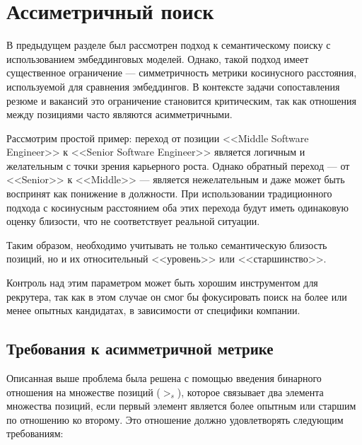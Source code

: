 \documentclass[14pt]{mmcs_article}
\begin{document}
\section{Ассиметричный поиск}\label{assymetric_search}

В предыдущем разделе был рассмотрен подход к семантическому поиску с использованием эмбеддинговых моделей. Однако, такой подход имеет существенное ограничение --- симметричность метрики косинусного расстояния, используемой для сравнения эмбеддингов. В контексте задачи сопоставления резюме и вакансий это ограничение становится критическим, так как отношения между позициями часто являются асимметричными.

Рассмотрим простой пример: переход от позиции <<Middle Software Engineer>> к <<Senior Software Engineer>> является логичным и желательным с точки зрения карьерного роста. Однако обратный переход --- от <<Senior>> к <<Middle>> --- является нежелательным и даже может быть воспринят как понижение в должности. При использовании традиционного подхода с косинусным расстоянием оба этих перехода будут иметь одинаковую оценку близости, что не соответствует реальной ситуации.

Таким образом, необходимо учитывать не только семантическую близость позиций, но и их относительный <<уровень>> или <<старшинство>>.

Контроль над этим параметром может быть хорошим инструментом для рекрутера, так как в этом случае он смог бы фокусировать поиск на более или менее опытных кандидатах, в зависимости от специфики компании.

\subsection{Требования к асимметричной метрике}

Описанная выше проблема была решена с помощью введения бинарного отношения на множестве позиций ($>_{s}$), которое связывает два элемента множества позиций, если первый элемент является более опытным или старшим по отношению ко второму. Это отношение должно удовлетворять следующим требованиям:
\end{document}
